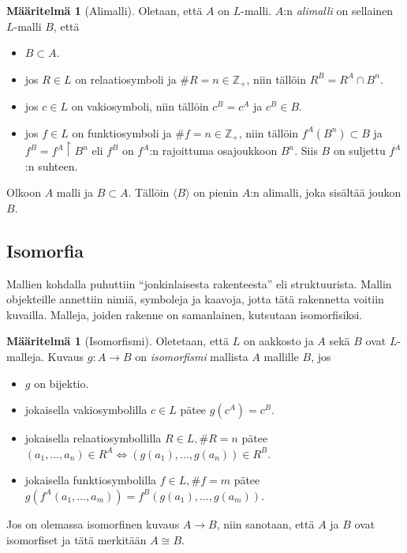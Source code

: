 \documentclass[finnish]{tktltiki2}
\theoremstyle{definition}
\newtheorem{maar}[lau]{Määritelmä}
\theoremstyle{remark}
\begin{document}
\begin{maar}[Alimalli]
Oletaan, että $A$ on $L$-malli. $A$:n \textit{alimalli} on sellainen $L$-malli $B$, että
\begin{itemize}
\item $B \subset A$.
\item jos $R \in L$ on relaatiosymboli ja $\#R = n \in \mathbb{Z}_+$, niin tällöin $R^B = R^A \cap B^n$.
\item jos $c \in L$ on vakiosymboli, niin tällöin $c^B = c^A$ ja $c^B \in B$.
\item jos $f \in L$ on funktiosymboli ja $\#f = n \in \mathbb{Z}_+$, niin tällöin $f^A(B^n) \subset B$ ja $f^B = f^A \restriction B^n$ eli $f^B$ on $f^A$:n rajoittuma osajoukkoon $B^n$. Siis $B$ on suljettu $f^A$:n suhteen.
\end{itemize}
\end{maar}

Olkoon $A$ malli ja $B \subset A$. Tällöin $\langle B \rangle$ on pienin $A$:n alimalli, joka sisältää joukon $B$. 

\subsection{Isomorfia}
Mallien kohdalla puhuttiin ``jonkinlaisesta rakenteesta'' eli struktuurista. Mallin objekteille annettiin nimiä, symboleja ja kaavoja, jotta tätä rakennetta voitiin kuvailla. Malleja, joiden rakenne on samanlainen, kutsutaan isomorfisiksi.

\begin{maar}[Isomorfismi]
Oletetaan, että $L$ on aakkosto ja $A$ sekä $B$ ovat $L$-malleja. Kuvaus $g: A \rightarrow B$ on \textit{isomorfismi} mallista $A$ mallille $B$, jos
\begin{itemize}
\item $g$ on bijektio.
\item jokaisella vakiosymbolilla $c \in L$ pätee $g(c^A) = c^B$.
\item jokaisella relaatiosymbollilla $R \in L, \#R = n$ pätee $(a_1, \ldots, a_n) \in R^A \Longleftrightarrow (g(a_1), \ldots, g(a_n)) \in R^B$.
\item jokaisella funktiosymbolilla $f \in L, \#f = m$ pätee $g(f^A(a_1, \ldots, a_m)) = f^B(g(a_1), \ldots, g(a_m))$.
\end{itemize}
Jos on olemassa isomorfinen kuvaus $A \rightarrow B$, niin sanotaan, että $A$ ja $B$ ovat isomorfiset ja tätä merkitään $A \cong B$.
\end{maar}
\end{document}
